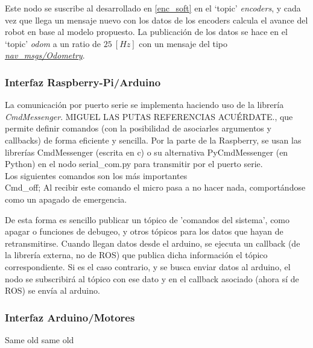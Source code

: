 Este nodo se suscribe al desarrollado en \ref{enc_soft} en el `topic' \textit{encoders}, y cada vez que llega un mensaje nuevo con los datos de los 
encoders calcula el avance del robot en base al modelo propuesto. La publicación de los datos se hace en el `topic' \textit{odom} a un ratio de $25\ [Hz]$ 
con un mensaje del tipo \textit{\href{http://docs.ros.org/kinetic/api/nav_msgs/html/msg/Odometry.html}{nav\_msgs/Odometry}}.

\subsubsection{Interfaz Raspberry-Pi/Arduino}
La comunicación por puerto serie se implementa haciendo uso de la librería \textit{CmdMessenger}. MIGUEL LAS PUTAS REFERENCIAS ACUÉRDATE., que permite definir comandos (con la posibilidad de asociarles argumentos y callbacks) de forma eficiente y sencilla.
Por la parte de la Raspberry, se usan las librerías CmdMessenger (escrita en c) o su alternativa PyCmdMessenger (en Python) en el nodo serial\_com.py para transmitir por el puerto serie.\\
Los siguientes comandos son los más importantes \\
Cmd\_off; Al recibir este comando el micro pasa a no hacer nada, comportándose como un apagado de emergencia. \par
De esta forma es sencillo publicar un tópico de 'comandos del sistema', como apagar o funciones de debugeo, y otros tópicos para los datos que hayan de retransmitirse. Cuando llegan datos desde el arduino, se ejecuta un callback (de la librería externa, no de ROS) que publica dicha información el tópico correspondiente. Si es el caso contrario, y se busca enviar datos al arduino, el nodo se subscribirá al tópico con ese dato y en el callback asociado (ahora sí de ROS) se envía al arduino.

\subsubsection{Interfaz Arduino/Motores}
Same old same old

